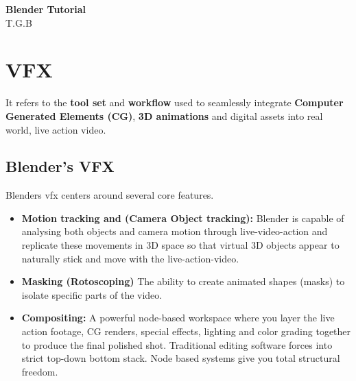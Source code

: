 \documentclass[11pt, a4paper]{article}
\begin{document}
\begin{center}
  \LARGE\textbf{Blender Tutorial}\\
  \large{T.G.B}
\end{center}

\section{VFX}
It refers to the \textbf{tool set} and  \textbf{workflow} used to seamlessly integrate
\textbf{Computer Generated Elements (CG)},  \textbf{3D animations} and digital assets into real
world, live action video.

\subsection{Blender's VFX}
Blenders vfx centers around several core features.
\begin{itemize}
  \item \textbf{Motion tracking and (Camera Object tracking):}
        Blender is capable of analysing both objects and camera motion through live-video-action
        and replicate these movements in 3D space so that virtual 3D objects appear to naturally
        stick and move with the live-action-video.

  \item  \textbf{Masking (Rotoscoping)}
        The ability to create animated shapes (masks) to isolate specific parts of the video.

  \item \textbf{Compositing:}
        A powerful node-based workspace where you layer the live action footage, CG renders,
        special effects, lighting and color grading together to produce the final polished shot.
        Traditional editing software forces into strict top-down bottom stack. Node based
        systems give you total structural freedom.
\end{itemize}
\end{document}
